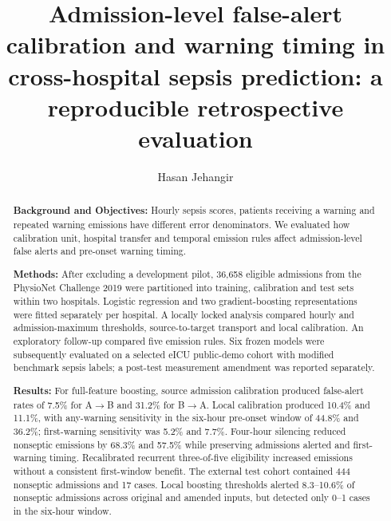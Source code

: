 \documentclass[preprint,12pt]{elsarticle}
\begin{document}
\begin{frontmatter}
\title{Admission-level false-alert calibration and warning timing in cross-hospital sepsis prediction: a reproducible retrospective evaluation}
\author{Hasan Jehangir}
\address{Independent researcher, Pakistan}
\begin{abstract}
\begin{singlespace}
\textbf{Background and Objectives:} Hourly sepsis scores, patients receiving a warning and repeated warning emissions have different error denominators. We evaluated how calibration unit, hospital transfer and temporal emission rules affect admission-level false alerts and pre-onset warning timing.

\textbf{Methods:} After excluding a development pilot, 36,658 eligible admissions from the PhysioNet Challenge 2019 were partitioned into training, calibration and test sets within two hospitals. Logistic regression and two gradient-boosting representations were fitted separately per hospital. A locally locked analysis compared hourly and admission-maximum thresholds, source-to-target transport and local calibration. An exploratory follow-up compared five emission rules. Six frozen models were subsequently evaluated on a selected eICU public-demo cohort with modified benchmark sepsis labels; a post-test measurement amendment was reported separately.

\textbf{Results:} For full-feature boosting, source admission calibration produced false-alert rates of 7.5\% for A$\to$B and 31.2\% for B$\to$A. Local calibration produced 10.4\% and 11.1\%, with any-warning sensitivity in the six-hour pre-onset window of 44.8\% and 36.2\%; first-warning sensitivity was 5.2\% and 7.7\%. Four-hour silencing reduced nonseptic emissions by 68.3\% and 57.5\% while preserving admissions alerted and first-warning timing. Recalibrated recurrent three-of-five eligibility increased emissions without a consistent first-window benefit. The external test cohort contained 444 nonseptic admissions and 17 cases. Local boosting thresholds alerted 8.3--10.6\% of nonseptic admissions across original and amended inputs, but detected only 0--1 cases in the six-hour window.


\end{singlespace}
\end{abstract}
\end{frontmatter}
\end{document}
